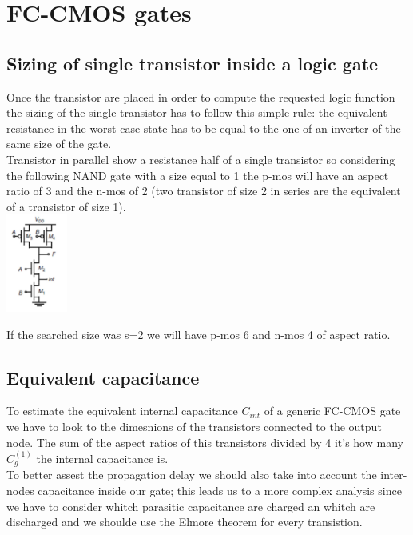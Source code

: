 \chapter{FC-CMOS gates}

\section{Sizing of single transistor inside a logic gate}
Once the transistor are placed in order to compute the requested logic function the sizing of the single transistor has to follow this simple rule: the equivalent resistance in the worst case state has to be equal to the one of an inverter of the same size of the gate.\\
Transistor in parallel show a resistance half of a single transistor so considering the following NAND gate with a size equal to 1 the p-mos will have an aspect ratio of 3 and the n-mos of 2 (two transistor of size 2 in series are the equivalent of a transistor of size 1).\\

\centering
\includegraphics[width=0.15\textwidth]{C6_1.png}\\
\raggedright

If the searched size was s=2 we will have p-mos 6 and n-mos 4 of aspect ratio.\\

\section{Equivalent capacitance}
To estimate the equivalent internal capacitance $C_{int}$ of a generic FC-CMOS gate we have to look to the dimesnions of the transistors connected to the output node. The sum of the aspect ratios of this transistors divided by 4 it's how many $C_g^{(1)}$ the internal capacitance is.\\
\vspace{5mm}
To better assest the propagation delay we should also take into account the inter-nodes capacitance inside our gate; this leads us to a more complex analysis since we have to consider whitch parasitic capacitance are charged an whitch are discharged and we shoulde use the Elmore theorem for every transistion.


